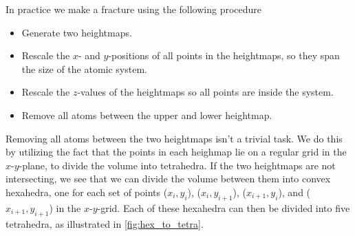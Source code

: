 In practice we make a fracture using the following procedure
\begin{itemize}
    \item Generate two heightmaps.
    \item Rescale the $x$- and $y$-positions of all points in the heightmaps, so they span the size of the atomic system.
    \item Rescale the $z$-values of the heightmaps so all points are inside the system.
    \item Remove all atoms between the upper and lower heightmap.
\end{itemize}

Removing all atoms between the two heightmaps isn't a trivial task. We do this by utilizing the fact that the points in each heighmap lie on a regular grid in the $x$-$y$-plane, to divide the volume into tetrahedra. If the two heightmaps are not intersecting, we see that we can divide the volume between them into convex hexahedra, one for each set of points
($x_{i}, y_{i}$), ($x_{i}, y_{i+1}$), ($x_{i+1}, y_{i}$), and ($x_{i+1}, y_{i+1}$) 
in the $x$-$y$-grid. Each of these hexahedra can then be divided into five tetrahedra, as illustrated in \cref{fig:hex_to_tetra}.

% 

